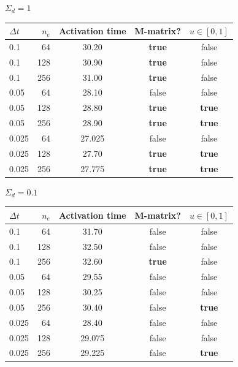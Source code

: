 \documentclass[14pt,aspectratio=169]{beamer}
\begin{document}
\begin{frame}{$\Sigma_d = 1$}
	\begin{table}[H]
		\centering
		\begin{tabular}{l|r|ccc}
			$\Delta t$ & $n_e$ & Activation time & M-matrix?     & $u \in [0, 1]$ \\
			\hline
			0.1        & 64    & 30.20           & \textbf{true} & false          \\
			0.1        & 128   & 30.90           & \textbf{true} & false          \\
			0.1        & 256   & 31.00           & \textbf{true} & false          \\
			0.05       & 64    & 28.10           & false         & false          \\
			0.05       & 128   & 28.80           & \textbf{true} & \textbf{true}  \\
			0.05       & 256   & 28.90           & \textbf{true} & \textbf{true}  \\
			0.025      & 64    & 27.025          & false         & false          \\
			0.025      & 128   & 27.70           & \textbf{true} & \textbf{true}  \\
			0.025      & 256   & 27.775          & \textbf{true} & \textbf{true}  \\
		\end{tabular}
	\end{table}
\end{frame}

\begin{frame}{$\Sigma_d = 0.1$}
	\begin{table}[H]
		\centering
		\begin{tabular}{l|r|ccc}
			$\Delta t$ & $n_e$ & Activation time & M-matrix?     & $u \in [0, 1]$ \\
			\hline
			0.1        & 64    & 31.70           & false         & false          \\
			0.1        & 128   & 32.50           & false         & false          \\
			0.1        & 256   & 32.60           & \textbf{true} & false          \\
			0.05       & 64    & 29.55           & false         & false          \\
			0.05       & 128   & 30.25           & false         & false          \\
			0.05       & 256   & 30.40           & false         & \textbf{true}  \\
			0.025      & 64    & 28.40           & false         & false          \\
			0.025      & 128   & 29.075          & false         & false          \\
			0.025      & 256   & 29.225          & false         & \textbf{true}  \\
		\end{tabular}
	\end{table}
\end{frame}
\end{document}
